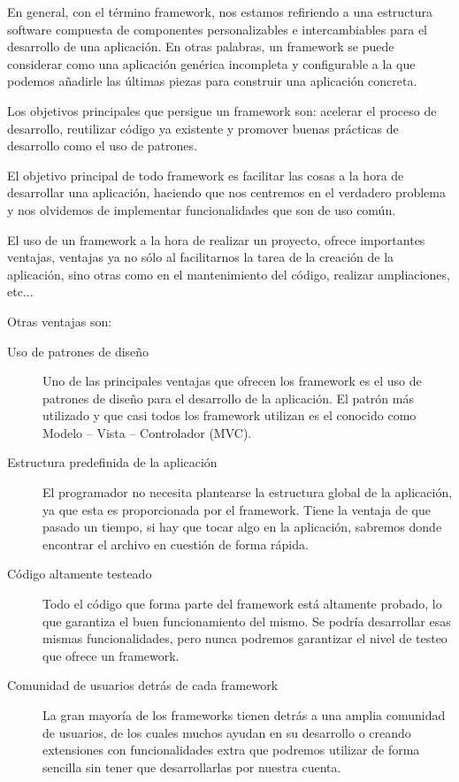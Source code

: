 En general, con el término framework, nos estamos refiriendo a una estructura software compuesta de componentes personalizables e intercambiables para el desarrollo de una aplicación. En otras palabras, un framework se puede considerar como una aplicación genérica incompleta y configurable a la que podemos añadirle las últimas piezas para construir una aplicación concreta. 

Los objetivos principales que persigue un framework son: acelerar el proceso de desarrollo, reutilizar código ya existente y promover buenas prácticas de desarrollo como el uso de patrones.

El objetivo principal de todo framework es facilitar las cosas a la hora de desarrollar una aplicación, haciendo que nos centremos en el verdadero problema y nos olvidemos de implementar funcionalidades que son de uso común.

El uso de un framework a la hora de realizar un proyecto, ofrece importantes ventajas, ventajas ya no sólo al facilitarnos la tarea de la creación de la aplicación, sino otras como en el mantenimiento del código, realizar ampliaciones, etc...

Otras ventajas son:
\begin{description}
    \item[Uso de patrones de diseño] Uno de las principales ventajas que ofrecen los framework es el uso de patrones de diseño para el desarrollo de la aplicación. El patrón más utilizado y que casi todos los framework utilizan es el conocido como Modelo – Vista – Controlador (MVC).
    
    \item[Estructura predefinida de la aplicación] El programador no necesita plantearse la estructura global de la aplicación, ya que esta es proporcionada por el  framework. Tiene la ventaja de que pasado un tiempo, si hay  que tocar algo en la aplicación, sabremos donde encontrar el archivo en cuestión de forma rápida.
    
    \item[Código altamente testeado] Todo el código que forma parte del framework está altamente probado, lo que garantiza el buen    funcionamiento del mismo. Se podría desarrollar esas mismas funcionalidades, pero   nunca podremos garantizar el nivel de testeo que ofrece un framework.
    
    \item[Comunidad de usuarios detrás de cada framework] La gran mayoría de los frameworks tienen detrás a una amplia comunidad de usuarios, de los    cuales muchos ayudan en su desarrollo o creando extensiones con funcionalidades extra que podremos utilizar de forma sencilla sin tener que desarrollarlas por nuestra cuenta.
\end{description}

